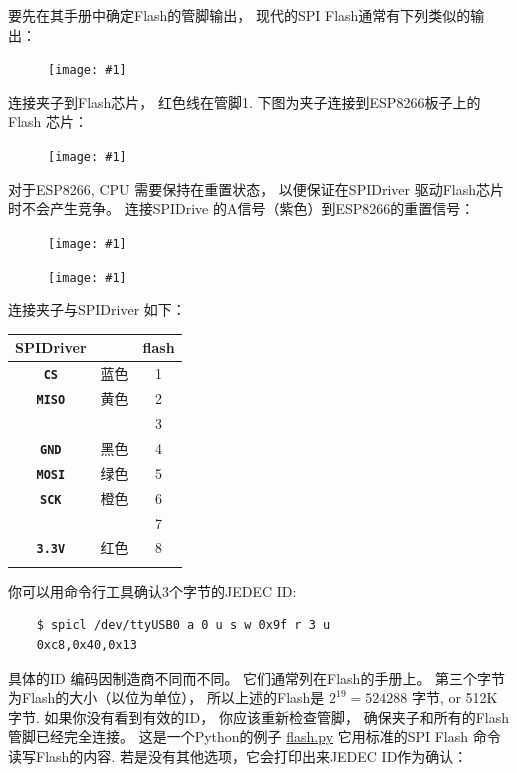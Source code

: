 \documentclass{article}
\newcommand{\png}[1]{
\begin{figure}[H]
\begin{center}
\texttt{[image: \#1]}
\end{center}
\end{figure}
}
\newcommand{\mach}[1]{\texttt{\textbf{#1}}}
\newcommand{\gap}{\vspace{10pt}}
\begin{document}
要先在其手册中确定Flash的管脚输出， 现代的SPI Flash通常有下列类似的输出： 

\png{img/spidriver/spidriver-flash-0}
连接夹子到Flash芯片， 红色线在管脚1. 
下图为夹子连接到ESP8266板子上的Flash 芯片：


\png{img/spidriver/spidriver-esp1}
 
对于ESP8266, CPU 需要保持在重置状态， 以便保证在SPIDriver 驱动Flash芯片时不会产生竞争。 
连接SPIDrive 的A信号（紫色）到ESP8266的重置信号：
 
\png{img/spidriver/spidriver-esp2}

\png{img/spidriver/spidriver-flash-2}

连接夹子与SPIDriver 如下： 

\begin{center}
\gap\begin{tabular}{ccc}
\hline
SPIDriver&        & flash   \\
\hline
\mach{CS}         & 蓝色   & 1 \\
\mach{MISO}       & 黄色 & 2 \\
                  &        & 3 \\
\mach{GND}        & 黑色  & 4 \\
\mach{MOSI}       & 绿色  & 5 \\
\mach{SCK}        & 橙色 & 6 \\
                  &        & 7 \\
\mach{3.3V}       & 红色    & 8 \\
\hline \\
\end{tabular}
\end{center}


你可以用命令行工具确认3个字节的JEDEC ID:

\begin{lstlisting}
    $ spicl /dev/ttyUSB0 a 0 u s w 0x9f r 3 u
    0xc8,0x40,0x13
\end{lstlisting}

具体的ID 编码因制造商不同而不同。 它们通常列在Flash的手册上。 
第三个字节为Flash的大小（以位为单位）， 所以上述的Flash是 
$2^{19} = 524288$ 字节, or 512K 字节.
如果你没有看到有效的ID， 你应该重新检查管脚， 确保夹子和所有的Flash管脚已经完全连接。 
这是一个Python的例子 
\href{https://github.com/jamesbowman/spidriver/blob/master/python/samples/flash.py>}{flash.py}
它用标准的SPI Flash 命令读写Flash的内容. 
若是没有其他选项，它会打印出来JEDEC ID作为确认： 
\end{document}
